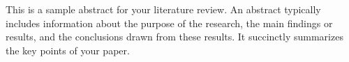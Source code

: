 This is a sample abstract for your literature review. An abstract typically includes information about the purpose of the research, the main findings or results, and the conclusions drawn from these results. It succinctly summarizes the key points of your paper.
